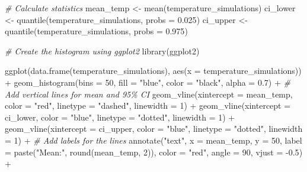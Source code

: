 \documentclass[
]{article}
\newenvironment{Shaded}{\begin{snugshade}}{\end{snugshade}}
\newcommand{\AttributeTok}[1]{\textcolor[rgb]{0.77,0.63,0.00}{#1}}
\newcommand{\CommentTok}[1]{\textcolor[rgb]{0.56,0.35,0.01}{\textit{#1}}}
\newcommand{\DecValTok}[1]{\textcolor[rgb]{0.00,0.00,0.81}{#1}}
\newcommand{\FloatTok}[1]{\textcolor[rgb]{0.00,0.00,0.81}{#1}}
\newcommand{\FunctionTok}[1]{\textcolor[rgb]{0.00,0.00,0.00}{#1}}
\newcommand{\NormalTok}[1]{#1}
\newcommand{\OtherTok}[1]{\textcolor[rgb]{0.56,0.35,0.01}{#1}}
\newcommand{\SpecialCharTok}[1]{\textcolor[rgb]{0.00,0.00,0.00}{#1}}
\newcommand{\StringTok}[1]{\textcolor[rgb]{0.31,0.60,0.02}{#1}}
\begin{document}
\begin{Shaded}
\begin{Highlighting}[]
\CommentTok{\# Calculate statistics}
\NormalTok{mean\_temp }\OtherTok{\textless{}{-}} \FunctionTok{mean}\NormalTok{(temperature\_simulations)}
\NormalTok{ci\_lower }\OtherTok{\textless{}{-}} \FunctionTok{quantile}\NormalTok{(temperature\_simulations, }\AttributeTok{probs =} \FloatTok{0.025}\NormalTok{)}
\NormalTok{ci\_upper }\OtherTok{\textless{}{-}} \FunctionTok{quantile}\NormalTok{(temperature\_simulations, }\AttributeTok{probs =} \FloatTok{0.975}\NormalTok{)}

\CommentTok{\# Create the histogram using ggplot2}
\FunctionTok{library}\NormalTok{(ggplot2)}

\FunctionTok{ggplot}\NormalTok{(}\FunctionTok{data.frame}\NormalTok{(temperature\_simulations), }\FunctionTok{aes}\NormalTok{(}\AttributeTok{x =}\NormalTok{ temperature\_simulations)) }\SpecialCharTok{+}
  \FunctionTok{geom\_histogram}\NormalTok{(}\AttributeTok{bins =} \DecValTok{50}\NormalTok{, }\AttributeTok{fill =} \StringTok{"blue"}\NormalTok{, }\AttributeTok{color =} \StringTok{"black"}\NormalTok{, }\AttributeTok{alpha =} \FloatTok{0.7}\NormalTok{) }\SpecialCharTok{+}
  \CommentTok{\# Add vertical lines for mean and 95\% CI}
  \FunctionTok{geom\_vline}\NormalTok{(}\AttributeTok{xintercept =}\NormalTok{ mean\_temp, }\AttributeTok{color =} \StringTok{"red"}\NormalTok{, }\AttributeTok{linetype =} \StringTok{"dashed"}\NormalTok{, }\AttributeTok{linewidth =} \DecValTok{1}\NormalTok{) }\SpecialCharTok{+}
  \FunctionTok{geom\_vline}\NormalTok{(}\AttributeTok{xintercept =}\NormalTok{ ci\_lower, }\AttributeTok{color =} \StringTok{"blue"}\NormalTok{, }\AttributeTok{linetype =} \StringTok{"dotted"}\NormalTok{, }\AttributeTok{linewidth =} \DecValTok{1}\NormalTok{) }\SpecialCharTok{+}
  \FunctionTok{geom\_vline}\NormalTok{(}\AttributeTok{xintercept =}\NormalTok{ ci\_upper, }\AttributeTok{color =} \StringTok{"blue"}\NormalTok{, }\AttributeTok{linetype =} \StringTok{"dotted"}\NormalTok{, }\AttributeTok{linewidth =} \DecValTok{1}\NormalTok{) }\SpecialCharTok{+}
  \CommentTok{\# Add labels for the lines}
  \FunctionTok{annotate}\NormalTok{(}\StringTok{"text"}\NormalTok{, }\AttributeTok{x =}\NormalTok{ mean\_temp, }\AttributeTok{y =} \DecValTok{50}\NormalTok{, }\AttributeTok{label =} \FunctionTok{paste}\NormalTok{(}\StringTok{"Mean:"}\NormalTok{, }\FunctionTok{round}\NormalTok{(mean\_temp, }\DecValTok{2}\NormalTok{)), }
           \AttributeTok{color =} \StringTok{"red"}\NormalTok{, }\AttributeTok{angle =} \DecValTok{90}\NormalTok{, }\AttributeTok{vjust =} \SpecialCharTok{{-}}\FloatTok{0.5}\NormalTok{) }\SpecialCharTok{+}

\end{Highlighting}
\end{Shaded}
\end{document}
